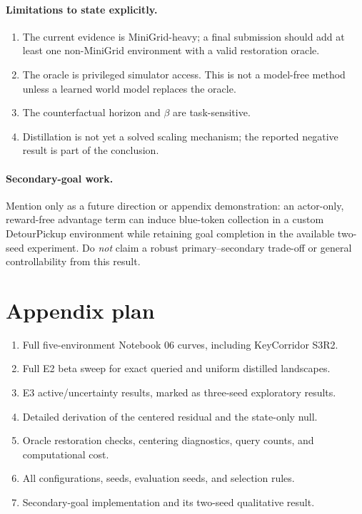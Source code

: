 \documentclass[11pt]{article}
\begin{document}
\paragraph{Limitations to state explicitly.}
\begin{enumerate}[leftmargin=1.6em]
  \item The current evidence is MiniGrid-heavy; a final submission should add
  at least one non-MiniGrid environment with a valid restoration oracle.
  \item The oracle is privileged simulator access. This is not a model-free
  method unless a learned world model replaces the oracle.
  \item The counterfactual horizon and $\beta$ are task-sensitive.
  \item Distillation is not yet a solved scaling mechanism; the reported
  negative result is part of the conclusion.
\end{enumerate}

\paragraph{Secondary-goal work.}
Mention only as a future direction or appendix demonstration: an actor-only,
reward-free advantage term can induce blue-token collection in a custom
DetourPickup environment while retaining goal completion in the available
two-seed experiment. Do \emph{not} claim a robust primary--secondary trade-off
or general controllability from this result.

\section{Appendix plan}
\begin{enumerate}[leftmargin=1.6em]
  \item Full five-environment Notebook 06 curves, including KeyCorridor S3R2.
  \item Full E2 beta sweep for exact queried and uniform distilled landscapes.
  \item E3 active/uncertainty results, marked as three-seed exploratory results.
  \item Detailed derivation of the centered residual and the state-only null.
  \item Oracle restoration checks, centering diagnostics, query counts, and
  computational cost.
  \item All configurations, seeds, evaluation seeds, and selection rules.
  \item Secondary-goal implementation and its two-seed qualitative result.
\end{enumerate}
\end{document}
